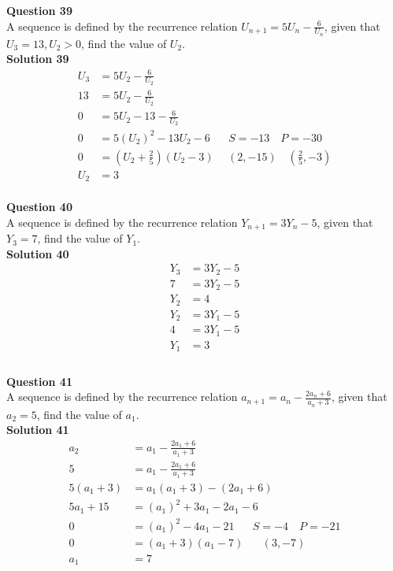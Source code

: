 \documentclass{article}
\begin{document}
\noindent\textbf{Question 39}\\[5pt]
A sequence is defined by the recurrence relation $U_{n+1}=5U_n-\displaystyle\frac{6}{U_n}$, given that  $U_3 =13, U_2 > 0$, find the value of $U_2$.\\[5pt]
\noindent\textbf{Solution 39}\\[5pt]
\begin{align*}
U_3&=5U_2-\displaystyle\frac{6}{U_2}\\[2pt]
13&=5U_2-\displaystyle\frac{6}{U_2}\\[2pt]
0&=5U_2-13 -\displaystyle\frac{6}{U_2}\\[2pt]
0&=5(U_2)^2-13U_2 -6\hspace{20pt}S=-13\quad P=-30\\[2pt]
0&=\left(U_2+\displaystyle\frac{2}{5}\right)(U_2-3)\hspace{15pt}(2,-15)\quad \left(\displaystyle\frac{2}{5},-3\right)\\[2pt]
U_2&=3
\end{align*}\\[10pt]

\noindent\textbf{Question 40}\\[5pt]
A sequence is defined by the recurrence relation $Y_{n+1}=3Y_n-5$, given that  $Y_3 =7$, find the value of $Y_1$.\\[5pt]
\noindent\textbf{Solution 40}\\[5pt]
\begin{align*}
Y_3&=3Y_2-5\\[2pt]
7&=3Y_2-5\\[2pt]
Y_2&=4\\[12pt]
Y_2&=3Y_1-5\\[2pt]
4&=3Y_1-5\\[2pt]
Y_1&=3\\
\end{align*}\\[10pt]

\noindent\textbf{Question 41}\\[5pt]
A sequence is defined by the recurrence relation $a_{n+1}=a_n-\displaystyle\frac{2a_n+6}{a_n+3}$, given that  $a_2 =5$, find the value of $a_1$.\\[5pt]
\noindent\textbf{Solution 41}\\[5pt]
\begin{align*}
a_2&=a_1-\displaystyle\frac{2a_1+6}{a_1+3}\\[2pt]
5&=a_1-\displaystyle\frac{2a_1+6}{a_1+3}\\[2pt]
5(a_1+3)&=a_1(a_1+3)-(2a_1+6)\\[2pt]
5a_1+15&=(a_1)^2+3a_1-2a_1-6\\[2pt]
0&=(a_1)^2-4a_1-21\hspace{20pt}S=-4 \quad P=-21\\[2pt]
0&=(a_1+3)(a_1-7)\hspace{20pt}(3,-7)\\[2pt]
a_1&=7
\end{align*}\\[10pt]
\end{document}
